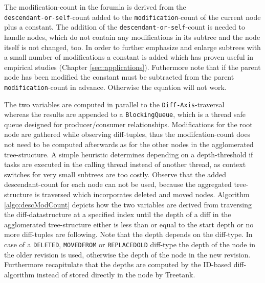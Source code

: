 The modification-count in the forumla is derived from the \\ \texttt{descendant-or-self}-count added to the \texttt{modification}-count of the current node plus a constant. The addition of the \texttt{descendant-or-self}-count is needed to handle nodes, which do not contain any modifications in its subtree and the node itself is not changed, too. In order to further emphasize and enlarge subtrees with a small number of modifications a constant is added which has proven useful in empirical studies (Chapter \ref{sec::applications}). Futhermore note that if the parent node has been modified the constant must be subtracted from the parent \texttt{modification}-count in advance. Otherwise the equation will not work.

The two variables are computed in parallel to the \texttt{Diff-Axis}-traversal \\whereas the results are appended to a \texttt{BlockingQueue}, which is a thread safe queue designed for producer/consumer relationships. Modifications for the root node are gathered while observing diff-tuples, thus the modifcation-count does not need to be computed afterwards as for the other nodes in the agglomerated tree-structure. A simple heuristic determines depending on a depth-threshold if tasks are executed in the calling thread instead of another thread, as context switches for very small subtrees are too costly. Observe that the added descendant-count for each node can not be used, because the aggregated tree-structure is traversed which incorporates deleted and moved nodes. Algorithm \ref{algo:descModCount} depicts how the two variables are derived from traversing the diff-datastructure at a specified index until the depth of a diff in the agglomerated tree-structure either is less than or equal to the start depth or no more diff-tuples are following. Note that the depth depends on the diff-type. In case of a \texttt{DELETED}, \texttt{MOVEDFROM} or \texttt{REPLACEDOLD} diff-type the depth of the node in the older revision is used, otherwise the depth of the node in the new revision. Furthermore recapitulate that the depths are computed by the ID-based diff-algorithm instead of stored directly in the node by Treetank.

